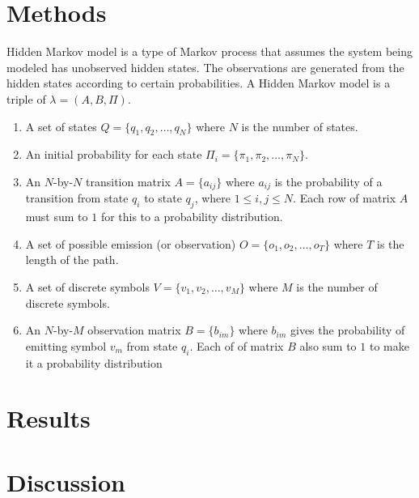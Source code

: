 \documentclass[twoside]{article}
\begin{document}
\begin{multicols}{2}
\section{Methods}
Hidden Markov model is a type of Markov process that assumes the system being modeled has unobserved hidden states. The observations are generated from the hidden states according to certain probabilities\cite{Elmez07}. A Hidden Markov model is a triple of $\lambda=(A, B, \Pi)$. 
\begin{enumerate}
	\item A set of states $Q = \{q_1, q_2, \ldots, q_N\}$ where $N$ is the number of states.
	\item An initial probability for each state $\Pi_i =\{\pi_1, \pi_2, \ldots, \pi_N\}$.
	\item An $N$-by-$N$ transition matrix $A=\{a_{ij}\}$ where $a_{ij}$ is the probability of a transition from state $q_i$ to state $q_j$, where $1 \leq i,j \leq N$. Each row of matrix $A$ must sum to $1$ for this to a probability distribution.
	\item A set of possible emission (or observation) $O=\{o_1, o_2, \ldots, o_T\}$ where $T$ is the length of the path.
	\item A set of discrete symbols $V = \{v_1, v_2, \ldots, v_M \}$ where $M$ is the number of discrete symbols.
	\item An $N$-by-$M$ observation matrix $B=\{b_{im}\}$ where $b_{im}$ gives the probability of emitting symbol $v_m$ from state $q_i$. Each of of matrix $B$ also sum to $1$ to make it a probability distribution
\end{enumerate}

\section{Results}



\section{Discussion}




\end{multicols}
\end{document}
